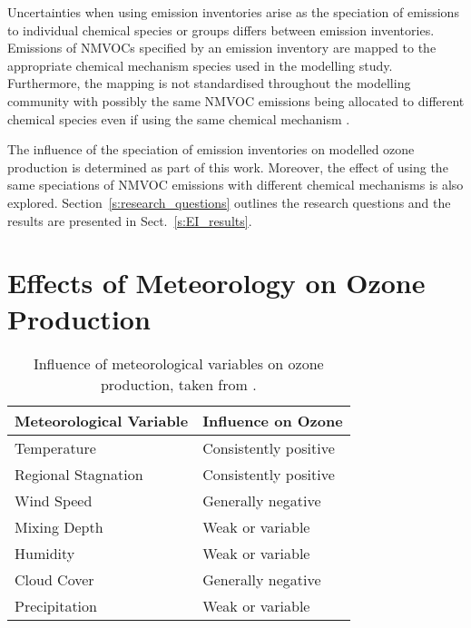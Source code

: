Uncertainties when using emission inventories arise as the speciation of emissions to individual chemical species or groups differs between emission inventories.
Emissions of NMVOCs specified by an emission inventory are mapped to the appropriate chemical mechanism species used in the modelling study.
Furthermore, the mapping is not standardised throughout the modelling community with possibly the same NMVOC emissions being allocated to different chemical species even if using the same chemical mechanism \citep{Carter:2015}.

The influence of the speciation of emission inventories on modelled ozone production is determined as part of this work.
Moreover, the effect of using the same speciations of NMVOC emissions with different chemical mechanisms is also explored.
Section~\ref{s:research_questions} outlines the research questions and the results are presented in Sect.~\ref{s:EI_results}.

\section{Effects of Meteorology on Ozone Production} \label{s:meteo_ozone}
\begin{table}
    \centering
    \caption[Influence of meteorological variables on ozone production]{Influence of meteorological variables on ozone production, taken from \citet{Jacob:2009}.}
    \begin{tabular}{ll}
        \hline \hline
        \textbf{Meteorological Variable} & \textbf{Influence on Ozone} \\
        \hline \hline
        Temperature & Consistently positive \\
        Regional Stagnation & Consistently positive \\
        Wind Speed & Generally negative \\
        Mixing Depth & Weak or variable \\
        Humidity & Weak or variable \\
        Cloud Cover & Generally negative \\
        Precipitation & Weak or variable \\
        \hline \hline
    \end{tabular}
    \label{t:meteo_vars}
\end{table}

